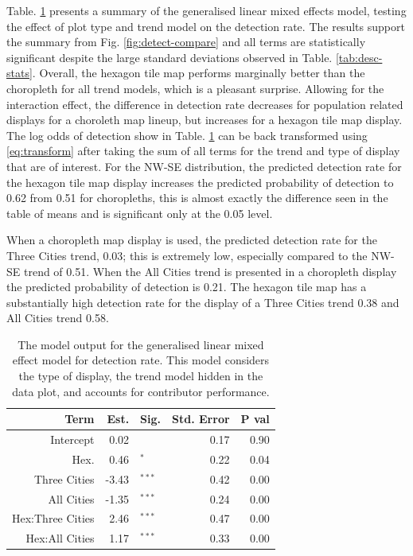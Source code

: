 \documentclass[conference,final,]{IEEEtran}
\begin{document}
Table. \ref{tab:detect-glmer1} presents a summary of the generalised linear mixed effects model, testing the effect of plot type and trend model on the detection rate. The results support the summary from Fig. \ref{fig:detect-compare} and all terms are statistically significant despite the large standard deviations observed in Table. \ref{tab:desc-stats}. Overall, the hexagon tile map performs marginally better than the choropleth for all trend models, which is a pleasant surprise. Allowing for the interaction effect, the difference in detection rate decreases for population related displays for a choroleth map lineup, but increases for a hexagon tile map display.
The log odds of detection show in Table. \ref{tab:detect-glmer1} can be back transformed using \ref{eq:transform} after taking the sum of all terms for the trend and type of display that are of interest.
For the NW-SE distribution, the predicted detection rate for the hexagon tile map display increases the predicted probability of detection to 0.62 from 0.51 for choropleths, this is almost exactly the difference seen in the table of means and is significant only at the 0.05 level.

When a choropleth map display is used, the predicted detection rate for the Three Cities trend, 0.03; this is extremely low, especially compared to the NW-SE trend of 0.51.
When the All Cities trend is presented in a choropleth display the predicted probability of detection is 0.21.
The hexagon tile map has a substantially high detection rate for the display of a Three Cities trend 0.38 and All Cities trend 0.58.

\begin{table}

\caption{\label{tab:detect-glmer1}The model output for the generalised linear mixed effect model for detection rate. This model considers the type of display, the trend model hidden in the data plot, and accounts for contributor performance.}
\centering
\begin{tabular}[t]{rrlrr}
\toprule
Term & Est. & Sig. & Std. Error & P val\\
\midrule
Intercept & 0.02 & $^{ }$ & 0.17 & 0.90\\
Hex. & 0.46 & $^{*}$ & 0.22 & 0.04\\
\addlinespace
Three Cities & -3.43 & $^{***}$ & 0.42 & 0.00\\
All Cities & -1.35 & $^{***}$ & 0.24 & 0.00\\
\addlinespace
Hex:Three Cities & 2.46 & $^{***}$ & 0.47 & 0.00\\
Hex:All Cities & 1.17 & $^{***}$ & 0.33 & 0.00\\
\bottomrule
\end{tabular}
\end{table}
\end{document}
